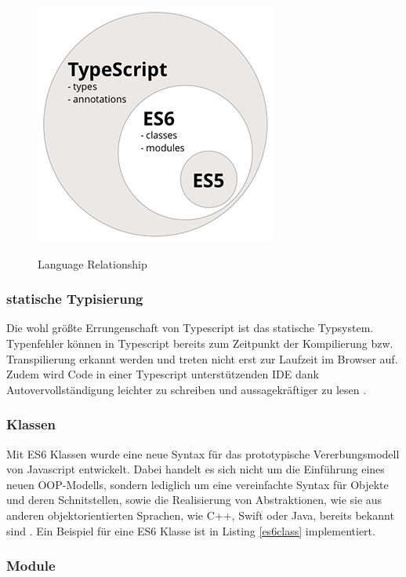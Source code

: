 \begin{figure}[ht]
 \centering
 \includegraphics[width=0.4\linewidth]{kapitel2/typescript----es5-es6-typescript-circle-diagram.png}
 \caption{Language Relationship}\cite[152]{ng-Book-2}
\end{figure}


\subsubsection{statische Typisierung}

Die wohl größte Errungenschaft von Typescript ist das statische Typsystem.
Typenfehler können in Typescript bereits zum Zeitpunkt
der Kompilierung bzw. Transpilierung erkannt werden und treten nicht erst zur Laufzeit im Browser auf.
Zudem wird Code in einer Typescript unterstützenden IDE dank Autovervollständigung
leichter zu schreiben und aussagekräftiger zu lesen \cite[156]{ng-Book-2}.

\subsubsection{Klassen}

Mit ES6 Klassen wurde eine neue Syntax für das prototypische Vererbungsmodell von Javascript entwickelt.
Dabei handelt es sich nicht um die Einführung eines neuen OOP-Modells, sondern lediglich um eine vereinfachte Syntax für Objekte und deren Schnitstellen,
sowie die Realisierung von Abstraktionen, wie sie aus anderen objektorientierten Sprachen, wie C++, Swift oder Java, bereits bekannt sind \cite{js-Klassen}.
Ein Beispiel für eine ES6 Klasse ist in Listing \ref{es6class} implementiert.



\subsubsection{Module}

